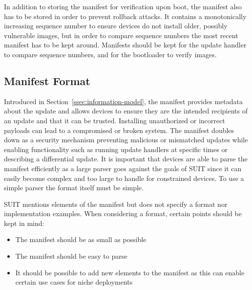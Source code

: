 \documentclass[0-thesis.tex]{subfiles}
\begin{document}
In addition to storing the manifest for verification upon boot, the manifest also has to
be stored in order to prevent rollback attacks. It contains a monotonically increasing
sequence number to ensure devices do not install older, possibly vulnerable images, but in
order to compare sequence numbers the most recent manifest has to be kept around.
Manifests should be kept for the update handler to compare sequence numbers, and for the
bootloader to verify images.

\subsection{Manifest Format}
\label{ssec:manifest-format}
Introduced in Section~\ref{ssec:information-model}, the manifest provides metadata about
the update and allows devices to ensure they are the intended recipients of an update and
that it can be trusted. Installing unauthorized or incorrect payloads can lead to a
compromised or broken system. The manifest doubles down as a security mechanism preventing
malicious or mismatched updates while enabling functionality such as running update
handlers at specific times or describing a differential update. It is important that
devices are able to parse the manifest efficiently as a large parser goes against the
goals of SUIT since it can easily become complex and too large to handle for constrained
devices. To use a simple parser the format itself must be simple.

SUIT mentions elements of the manifest but does not specify a format nor implementation
examples. When considering a format, certain points should be kept in mind:

\begin{itemize}
        \item The manifest should be as small as possible
        \item The manifest should be easy to parse
        \item It should be possible to add new elements to the manifest as this can enable
                certain use cases for niche deployments
\end{itemize}
\end{document}
